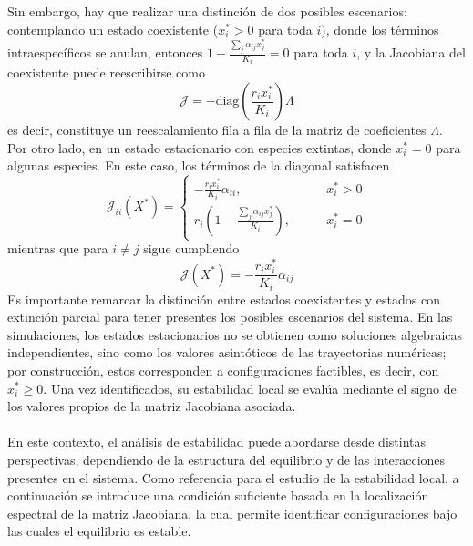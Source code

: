 Sin embargo, hay que realizar una distinción de dos posibles escenarios: contemplando un estado coexistente ($x_i^*>0$ para toda $i$), donde los términos intraespecíficos se anulan, entonces $1-\frac{\sum_j\alpha_{ij}x_j^*}{K_i}=0$ para toda $i$, y la Jacobiana del coexistente puede reescribirse como 
$$\mathcal{J}=-\text{diag}\left (\frac{r_ix_i^*}{K_i}\right )\Lambda$$
es decir, constituye un reescalamiento fila a fila de la matriz de coeficientes $\Lambda$. Por otro lado, en un estado estacionario con especies extintas, donde $x_i^*=0$ para algunas especies. En este caso, los términos de la diagonal satisfacen
$$
\mathcal{J}_{ii}(X^*)=\begin{cases}
	-\frac{r_ix_i^*}{K_i}\alpha_{ii},\qquad& x_i^*>0\\
	r_i\left (1-\frac{\sum_j\alpha_{ij}x_j^*}{K_i}\right ),\qquad& x_i^*=0
\end{cases}
$$
mientras que para $i\neq j$ sigue cumpliendo
$$
\mathcal{J}(X^*)=-\frac{r_ix_i^*}{K_i}\alpha_{ij}
$$
Es importante remarcar la distinción entre estados coexistentes y estados con extinción parcial para tener presentes los posibles escenarios del sistema. En las simulaciones, los estados estacionarios no se obtienen como soluciones algebraicas independientes, sino como los valores asintóticos de las trayectorias numéricas; por construcción, estos corresponden a configuraciones factibles, es decir, con $x_i^*\geq0$. Una vez identificados, su estabilidad local se evalúa mediante el signo de los valores propios de la matriz Jacobiana asociada. \\
\\
En este contexto, el análisis de estabilidad puede abordarse desde distintas perspectivas, dependiendo de la estructura del equilibrio y de las interacciones presentes en el sistema. Como referencia para el estudio de la estabilidad local, a continuación se introduce una condición suficiente basada en la localización espectral de la matriz Jacobiana, la cual permite identificar configuraciones bajo las cuales el equilibrio es estable.

